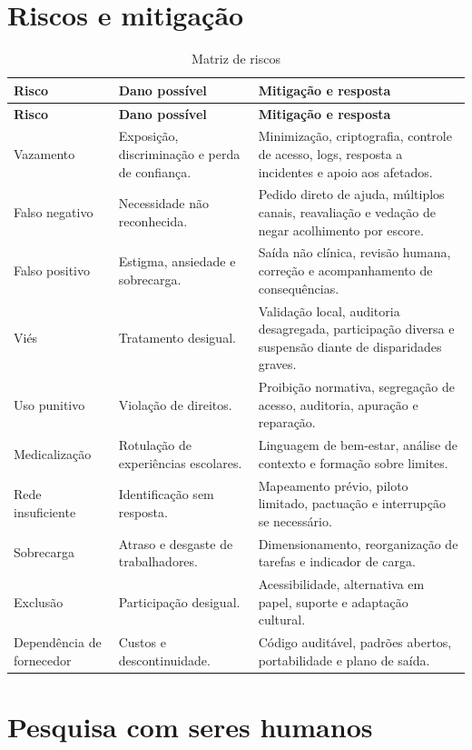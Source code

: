 \documentclass[
  12pt,
  openright,
  oneside,
  a4paper,
  english,
  brazil
]{abntex2}
\begin{document}
\section{Riscos e mitigação}

\begin{longtable}{p{3.1cm}p{4.4cm}p{5.4cm}}
\caption{Matriz de riscos}\label{tab:riscos}\\
\toprule
\textbf{Risco} & \textbf{Dano possível} & \textbf{Mitigação e resposta} \\
\midrule
\endfirsthead
\toprule
\textbf{Risco} & \textbf{Dano possível} & \textbf{Mitigação e resposta} \\
\midrule
\endhead
Vazamento & Exposição, discriminação e perda de confiança. & Minimização, criptografia, controle de acesso, logs, resposta a incidentes e apoio aos afetados. \\
Falso negativo & Necessidade não reconhecida. & Pedido direto de ajuda, múltiplos canais, reavaliação e vedação de negar acolhimento por escore. \\
Falso positivo & Estigma, ansiedade e sobrecarga. & Saída não clínica, revisão humana, correção e acompanhamento de consequências. \\
Viés & Tratamento desigual. & Validação local, auditoria desagregada, participação diversa e suspensão diante de disparidades graves. \\
Uso punitivo & Violação de direitos. & Proibição normativa, segregação de acesso, auditoria, apuração e reparação. \\
Medicalização & Rotulação de experiências escolares. & Linguagem de bem-estar, análise de contexto e formação sobre limites. \\
Rede insuficiente & Identificação sem resposta. & Mapeamento prévio, piloto limitado, pactuação e interrupção se necessário. \\
Sobrecarga & Atraso e desgaste de trabalhadores. & Dimensionamento, reorganização de tarefas e indicador de carga. \\
Exclusão & Participação desigual. & Acessibilidade, alternativa em papel, suporte e adaptação cultural. \\
Dependência de fornecedor & Custos e descontinuidade. & Código auditável, padrões abertos, portabilidade e plano de saída. \\
\bottomrule
\end{longtable}

\section{Pesquisa com seres humanos}
\end{document}
